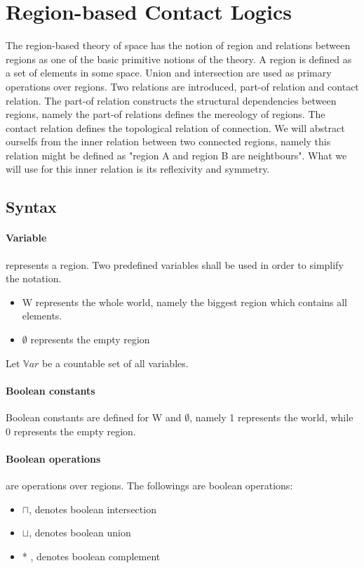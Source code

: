 \documentclass{article}
\begin{document}
	\section{Region-based Contact Logics}
The region-based theory of space has the notion of region and relations between regions as one of the basic primitive notions of the theory.
A region is defined as a set of elements in some space. Union and intersection are used as primary operations over regions.
Two relations are introduced, part-of relation and contact relation. 
The part-of relation constructs the structural dependencies between regions, namely the part-of relations defines the mereology of regions.
The contact relation defines the topological relation of connection. We will abstract ourselfs from the inner relation between two connected regions, namely
this relation might be defined as "region A and region B are neightbours". What we will use for this inner relation is its reflexivity and symmetry.
	\subsection{Syntax}

	\paragraph{Variable} 
represents a region. Two predefined variables shall be used in order to simplify the notation. 
		\begin{itemize}
			\item W represents the whole world, namely the biggest region which contains all elements.
			\item $\emptyset$ represents the empty region
		\end{itemize}
Let $\mathbb{V}ar$ be a countable set of all variables.

	\paragraph{Boolean constants}
Boolean constants are defined for W and $\emptyset$, namely 1 represents the world, while 0 represents the empty region.

	\paragraph{Boolean operations}
are operations over regions. The followings are boolean operations:
		\begin{itemize}
			\item $\sqcap$, denotes boolean intersection
			\item $\sqcup$, denotes boolean union
			\item * , denotes boolean complement
		\end{itemize}
\end{document}
